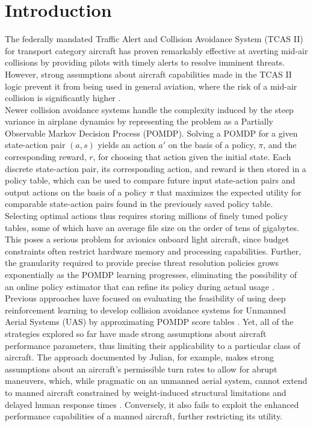 \documentclass[journal, a4paper]{IEEEtran}
\begin{document}
\section{Introduction}
    \IEEEPARstart{}The federally mandated Traffic Alert and Collision Avoidance System (TCAS II) for transport category aircraft has proven remarkably effective at averting mid-air collisions by providing pilots with timely alerts to resolve imminent threats. However, strong assumptions about aircraft capabilities made in the TCAS II logic prevent it from being used in general aviation, where the risk of a mid-air collision is significantly higher \cite{midairgastats}.
\\Newer collision avoidance systems handle the complexity induced by the steep variance in airplane dynamics by representing the problem as a Partially Observable Markov Decision Process (POMDP)\cite{pomdpinit}. Solving a POMDP for a given state-action pair $(a, s)$ yields an action $a'$ on the basis of a policy, $\pi$, and the corresponding reward, $r$, for choosing that action given the initial state. Each discrete state-action pair, its corresponding action, and reward is then stored in a policy table, which can be used to compare future input state-action pairs and output actions on the basis of a policy $\pi$ that maximizes the expected utility for comparable state-action pairs found in the previously saved policy table. Selecting optimal actions thus requires storing millions of finely tuned policy tables, some of which have an average file size on the order of tens of gigabytes. This poses a serious problem for avionics onboard light aircraft, since budget constraints often restrict hardware memory and processing capabilities. Further, the granularity required to provide precise threat resolution policies grows exponentially as the POMDP learning progresses, eliminating the possibility of an online policy estimator that can refine its policy during actual usage \cite{pomdppolicexpansion}.
\\Previous approaches have focused on evaluating the feasibility of using deep reinforcement learning to develop collision avoidance systems for Unmanned Aerial Systems (UAS) by approximating POMDP score tables \cite{deeprlcas}. Yet, all of the strategies explored so far have made strong assumptions about aircraft performance parameters, thus limiting their applicability to a particular class of aircraft. The approach documented by Julian, for example, makes strong assumptions about an aircraft's permissible turn rates to allow for abrupt maneuvers, which, while pragmatic on an unmanned aerial system, cannot extend to manned aircraft constrained by weight-induced structural limitations and delayed human response times \cite{deeprlcas}. Conversely, it also fails to exploit the enhanced performance capabilities of a manned aircraft, further restricting its utility.
\end{document}
